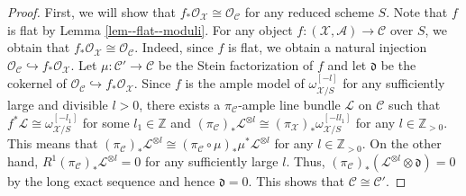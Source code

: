 \documentclass[12pt,twoside]{amsart}
\theoremstyle{definition}
\begin{document}
  \begin{proof}
  First, we will show that $f_*\mathcal{O}_{\mathcal{X}}\cong\mathcal{O}_{\mathcal{C}}$ for any reduced scheme $S$.
  Note that $f$ is flat by Lemma \ref{lem--flat--moduli}.
   For any object $f\colon (\mathcal{X},\mathscr{A})\to\mathcal{C}$ over $S$, we obtain that $f_*\mathcal{O}_{\mathcal{X}}\cong\mathcal{O}_{\mathcal{C}}$.
    Indeed, since $f$ is flat, we obtain a natural injection $\mathcal{O}_{\mathcal{C}}\hookrightarrow f_*\mathcal{O}_{\mathcal{X}}$.
    Let $\mu\colon\mathcal{C}'\to\mathcal{C}$ be the Stein factorization of $f$ and let $\mathfrak{d}$ be the cokernel of $\mathcal{O}_{\mathcal{C}}\hookrightarrow f_*\mathcal{O}_{\mathcal{X}}$.
    Since $f$ is the ample model of $\omega_{\mathcal{X}/S}^{[-l]}$ for any sufficiently large and divisible $l>0$, there exists a $\pi_{\mathcal{C}}$-ample line bundle $\mathscr{L}$ on $\mathcal{C}$ such that $f^*\mathscr{L}\cong \omega_{\mathcal{X}/S}^{[-l_1]}$ for some $l_1\in\mathbb{Z}$ and $(\pi_{\mathcal{C}})_*\mathscr{L}^{\otimes l}\cong (\pi_{\mathcal{X}})_*\omega_{\mathcal{X}/S}^{[-ll_1]}$ for any $l\in\mathbb{Z}_{>0}$.
    This means that $(\pi_{\mathcal{C}})_*\mathscr{L}^{\otimes l}\cong (\pi_{\mathcal{C}}\circ\mu)_*\mu^*\mathscr{L}^{\otimes l}$ for any $l\in\mathbb{Z}_{>0}$.
    On the other hand, $R^1(\pi_{\mathcal{C}})_*\mathscr{L}^{\otimes l}=0$ for any sufficiently large $l$.
    Thus, $(\pi_{\mathcal{C}})_*(\mathscr{L}^{\otimes l}\otimes \mathfrak{d})=0$ by the long exact sequence and hence $\mathfrak{d}=0$.
    This shows that $\mathcal{C}\cong\mathcal{C}'$.
  

\end{proof}
\end{document}
